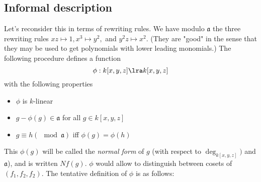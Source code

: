 \subsection{Informal description}
Let's reconsider this in terms of rewriting rules. We have
modulo $\mathfrak{a}$
the three rewriting rules $xz\mapsto 1, x^3\mapsto y^2,$
and $y^2z\mapsto x^2$. (They are "good" in the sense that 
they may be used to get polynomials with lower leading
monomials.) The following procedure defines a function
\[ \phi : k[x,y,z] \lra k[x,y,z]
\]
with the following properties
\begin{itemize}
\item $\phi$ is $k$-linear
\item $g-\phi(g)\in \mathfrak{a}$ for all $g\in k[x,y,z]$
\item $g\equiv h (\mod \mathfrak{a})$ iff $\phi(g) = \phi(h)$
\end{itemize}

This $\phi(g)$ will be called the \textit{normal form}
of $g$ (with respect to $\deg_{k[x,y,z]})$ and $\mathfrak{a}$),
and is written $Nf(g)$. $\phi$ would allow to distinguish
    between cosets of $(f_1, f_2, f_2)$. The tentative definition
of $\phi$ is as follows:







